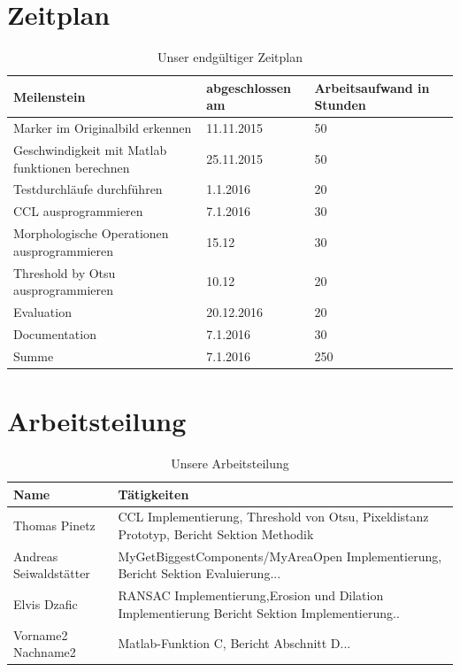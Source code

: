 \documentclass[deutsch]{scrartcl}
\begin{document}
\section{Zeitplan}

\begin{center}
	\begin{table}
		\begin{tabularx}{\textwidth}{ |X|X|X| }
			\hline
			Meilenstein & abgeschlossen am & Arbeitsaufwand in Stunden\\
			\hline		
			Marker im Originalbild erkennen & 11.11.2015 &	50 \\
			\hline
			Geschwindigkeit mit Matlab funktionen berechnen & 25.11.2015 & 50\\ 
			\hline
			Testdurchläufe durchführen & 1.1.2016 & 20 \\
			\hline
			CCL ausprogrammieren & 7.1.2016 & 30\\
			\hline		
			Morphologische Operationen ausprogrammieren & 15.12 & 30 \\
			\hline
			Threshold by Otsu ausprogrammieren & 10.12 & 20 \\
			\hline
			Evaluation & 20.12.2016 & 20 \\
			\hline
			Documentation & 7.1.2016 & 30 \\
			\hline
			\hline
			Summe & 7.1.2016 & 250 \\
			\hline
		\end{tabularx}	
		\caption{Unser endgültiger Zeitplan}
		\label{table:zeitplan}
	\end{table}
\end{center}


\section{Arbeitsteilung}

\begin{center}
	\begin{table}
	\begin{tabularx} {\textwidth}{ |X | X | }
		\hline
		Name & Tätigkeiten\\
		\hline
		Thomas Pinetz & CCL Implementierung, Threshold von Otsu, \newline Pixeldistanz Prototyp, Bericht Sektion Methodik \\
		\hline
		Andreas Seiwaldstätter & MyGetBiggestComponents/MyAreaOpen Implementierung, \newline Bericht Sektion Evaluierung...\\
		\hline
		\hline
		Elvis Dzafic & RANSAC Implementierung,Erosion und Dilation Implementierung \newline Bericht Sektion Implementierung..\\
		\hline
		\hline
		Vorname2 Nachname2 & Matlab-Funktion C, Bericht Abschnitt D...\\
		\hline
	\end{tabularx}
		\caption{Unsere Arbeitsteilung}
		\label{table:arbeitsteilung}	
	\end{table}
\end{center}
\end{document}
